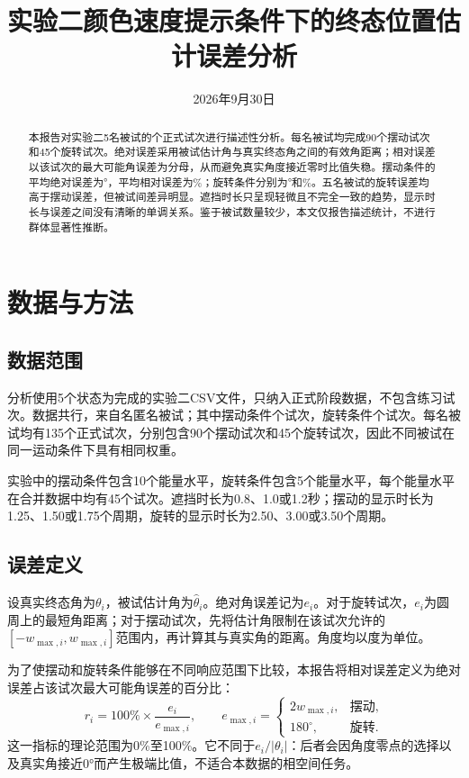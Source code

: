 \documentclass[UTF8,a4paper,oneside,zihao=-4]{ctexart}
\title{实验二颜色速度提示条件下的终态位置估计误差分析}
\author{}
\date{2026年9月30日}
\begin{document}
\maketitle

\begin{abstract}
本报告对实验二5名被试的\TotalTrials{}个正式试次进行描述性分析。每名被试均完成90个摆动试次和45个旋转试次。绝对误差采用被试估计角与真实终态角之间的有效角距离；相对误差以该试次的最大可能角误差为分母，从而避免真实角度接近零时比值失稳。摆动条件的平均绝对误差为\OscAbsMean{}°，平均相对误差为\OscRelMean{}\%；旋转条件分别为\RotAbsMean{}°和\RotRelMean{}\%。五名被试的旋转误差均高于摆动误差，但被试间差异明显。遮挡时长只呈现轻微且不完全一致的趋势，显示时长与误差之间没有清晰的单调关系。鉴于被试数量较少，本文仅报告描述统计，不进行群体显著性推断。
\end{abstract}


\section{数据与方法}
\label{sec:method}

\subsection{数据范围}

分析使用5个状态为完成的实验二CSV文件，只纳入正式阶段数据，不包含练习试次。数据共\TotalTrials{}行，来自\TotalSubjects{}名匿名被试；其中摆动条件\OscTrials{}个试次，旋转条件\RotTrials{}个试次。每名被试均有135个正式试次，分别包含90个摆动试次和45个旋转试次，因此不同被试在同一运动条件下具有相同权重。

实验中的摆动条件包含10个能量水平，旋转条件包含5个能量水平，每个能量水平在合并数据中均有45个试次。遮挡时长为0.8、1.0或1.2秒；摆动的显示时长为1.25、1.50或1.75个周期，旋转的显示时长为2.50、3.00或3.50个周期。

\subsection{误差定义}

设真实终态角为$\theta_i$，被试估计角为$\hat{\theta}_i$。绝对角误差记为$e_i$。对于旋转试次，$e_i$为圆周上的最短角距离；对于摆动试次，先将估计角限制在该试次允许的$[-w_{\max,i},w_{\max,i}]$范围内，再计算其与真实角的距离。角度均以度为单位。

为了使摆动和旋转条件能够在不同响应范围下比较，本报告将相对误差定义为绝对误差占该试次最大可能角误差的百分比：
\begin{equation}
    r_i=100\%\times\frac{e_i}{e_{\max,i}},\qquad
    e_{\max,i}=\begin{cases}
        2w_{\max,i}, & \text{摆动},\\
        180^\circ, & \text{旋转}.
    \end{cases}
    \label{eq:relative-error}
\end{equation}
这一指标的理论范围为0\%至100\%。它不同于$e_i/|\theta_i|$：后者会因角度零点的选择以及真实角接近0°而产生极端比值，不适合本数据的相空间任务。
\end{document}

